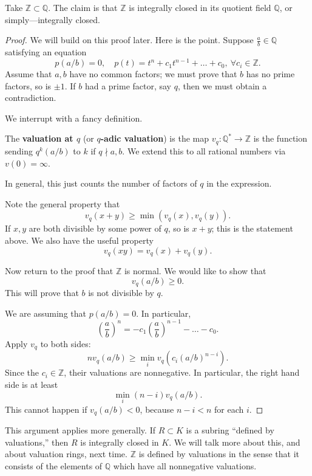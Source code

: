 \begin{example} 
Take $\mathbb{Z} \subset \mathbb{Q}$. The claim is that $\mathbb{Z}$ is
integrally closed in its quotient field $\mathbb{Q}$, or simply---integrally closed. 
\end{example} 
\begin{proof} 
We will build on this proof later. Here is the point. Suppose $\frac{a}{b}
\in \mathbb{Q}$ satisfying an equation
\[ p(a/b) = 0, \quad p(t) = t^n + c_1 t^{n-1} + \dots + c_0 , \ \forall c_i \in
\mathbb{Z}.\]
Assume that $a,b$ have no common factors; we must prove that $b$ has no prime
factors, so is $\pm 1$. 
If $b$ had a prime factor, say $q$, then we must obtain a contradiction.

We interrupt with a fancy definition.
\begin{definition} 
The \textbf{valuation at $q$} (or \textbf{$q$-adic valuation}) is the map
$v_q: \mathbb{Q}^* \to \mathbb{Z}$ is the
function sending $q^k (a/b)$ to $k$ if $q \nmid a,b$. We extend this to all
rational numbers via $v(0) = \infty$. 
\end{definition} 
In general, this just counts the number of factors of $q$ in the expression.


Note the general property that
\[ v_q(x+y) \geq \min( v_q(x), v_q(y)) . \]
If $x,y$ are both divisible by some power of $q$, so is $x+y$; this is the
statement above. We also have the useful property
\[ v_q(xy) = v_q(x) + v_q(y).  \]




Now return to the proof that $\mathbb{Z}$ is normal. We would like to show that
\[ v_q(a/b) \geq 0.  \]
This will prove that $b$ is not divisible by $q$.

We are assuming that $p(a/b) = 0$. In particular,
\[ \left( \frac{a}{b}  \right)^n = -c_1 \left( \frac{a}{b}  \right)^{n-1} -
\dots - c_0.  \]
Apply $v_q$ to both sides:
\[ n v_q ( a/b) \geq \min_i v_q( c_i (a/b)^{n-i}).  \]
Since the $c_i \in \mathbb{Z}$, their valuations are nonnegative. In
particular, the right hand side is at least
\[ \min_i  (n-i) v_q(a/b). \]
This cannot happen if $v_q(a/b)<0$, because $n-i < n$ for each $i$. 
\end{proof} 

This argument applies more generally. If $R \subset K$ is a subring ``defined
by valuations,'' then $R$ is integrally closed in $K$.  We will talk more about
this, and about valuation rings, next time.  
$\mathbb{Z}$ is defined by valuations in the sense that it consists of the
elements of $\mathbb{Q}$ which have all nonnegative valuations.

